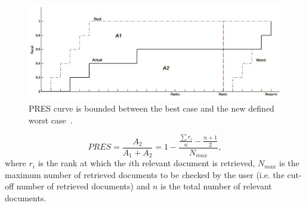\begin{figure}[htpb]
   \centering
   \includegraphics[scale=.37]{figs/pres.jpg}
   \caption{PRES curve is bounded between the best case and the new defined worst case~\citep{magdy2010pres}.}  
   \label{fig:pres} 
\end{figure}
\FloatBarrier 
\begin{equation}
\label{eq:pres}
PRES=\frac{A_{2}}{A_{1}+A_{2}}=1-\frac{\frac{\sum r_{i}}{n}-\frac{n+1}{2}}{N_{max}},
\end{equation}
where $ r_{i} $ is the rank at which the $ i $th relevant document is retrieved, $ N_{max} $ is the maximum number of retrieved documents to be checked by the user (i.e. the cut-off number of retrieved documents) and $ n $ is the total number of relevant documents.